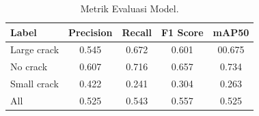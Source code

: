 \documentclass[12pt,a4paper]{article}
\begin{document}
\begin{table}[ht]
\centering
\begin{tabularx}{0.7\textwidth}{lCCCC}
    \toprule
    \textbf{Label} & \textbf{Precision} & \textbf{Recall} & \textbf{F1 Score} & \textbf{mAP50} \\
    \midrule
    Large crack & 0.545 & 0.672 & 0.601 & 00.675 \\
    No crack & 0.607 & 0.716 & 0.657 & 0.734 \\
    Small crack & 0.422 & 0.241 & 0.304 & 0.263 \\
    All & 0.525 & 0.543 & 0.557 & 0.525 \\
    \bottomrule
\end{tabularx}
\caption{Metrik Evaluasi Model.}
\label{tab:with_others}
\end{table}
\end{document}
